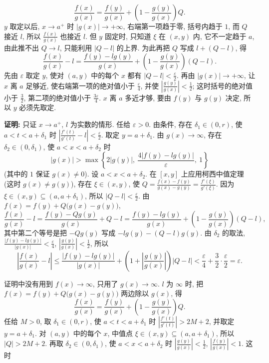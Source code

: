 \documentclass[UTF8,openany]{ctexbook}
\theoremstyle{chinesetextbook}
\newenvironment{cnproof}{\par\indent\textbf{证明:} \ignorespaces}{\par}
\begin{document}
\[
\frac{f(x)}{g(x)}=\frac{f(y)}{g(x)}+\left(1-\frac{g(y)}{g(x)}\right)Q.
\]
$y$ 取定以后, $x\to a^+$ 时 $|g(x)|\to+\infty$, 右端第一项趋于零, 括号内趋于 $1$, 而 $Q$ 接近 $l$, 所以 $\displaystyle\frac{f(x)}{g(x)}$ 也接近 $l$. 但 $y$ 固定时, 只知道 $\xi$ 在 $(x,y)$ 内, 它不一定趋于 $a$, 由此推不出 $Q\to l$, 只能利用 $|Q-l|$ 的上界. 为此再把 $Q$ 写成 $l+(Q-l)$, 得
\[
\frac{f(x)}{g(x)}-l=\frac{f(y)-lg(y)}{g(x)}+\left(1-\frac{g(y)}{g(x)}\right)(Q-l).
\]
先由 $\varepsilon$ 取定 $y$, 使对 $(a,y)$ 中的每个 $x$ 都有 $\displaystyle|Q-l|<\frac\varepsilon2$. 再由 $|g(x)|\to+\infty$, 让 $x$ 离 $a$ 足够近, 使右端第一项的绝对值小于 $\displaystyle\frac\varepsilon4$, 并使 $\displaystyle\left|\frac{g(y)}{g(x)}\right|<\frac12$; 这时括号的绝对值小于 $\displaystyle\frac32$, 第二项的绝对值小于 $\displaystyle\frac{3\varepsilon}4$. $x$ 离 $a$ 多近才够, 要由 $f(y)$ 与 $g(y)$ 决定, 所以 $y$ 必须先取定.
\begin{cnproof}
只证 $x\to a^+$, $l$ 为实数的情形. 任给 $\varepsilon>0$. 由条件, 存在 $\delta_1\in(0,r)$, 使 $a<t<a+\delta_1$ 时 $\displaystyle\left|\frac{f'(t)}{g'(t)}-l\right|<\frac\varepsilon2$. 取定 $y=a+\delta_1$. 由 $g(x)\to\infty$, 存在 $\delta_2\in(0,\delta_1)$, 使 $a<x<a+\delta_2$ 时
\[
|g(x)|>\max\left\{2|g(y)|,\ \frac{4|f(y)-lg(y)|}\varepsilon,\ 1\right\}
\]
(其中的 $1$ 保证 $g(x)\ne0$). 设 $a<x<a+\delta_2$. 在 $[x,y]$ 上应用柯西中值定理 (这时 $g(x)\ne g(y)$), 存在 $\xi\in(x,y)$, 使 $\displaystyle Q=\frac{f(x)-f(y)}{g(x)-g(y)}=\frac{f'(\xi)}{g'(\xi)}$. 因为 $\xi\in(x,y)\subseteq(a,a+\delta_1)$, 所以 $\displaystyle|Q-l|<\frac\varepsilon2$. 由 $f(x)=f(y)+Q\bigl(g(x)-g(y)\bigr)$,
\[
\frac{f(x)}{g(x)}-l=\frac{f(y)-Qg(y)}{g(x)}+Q-l=\frac{f(y)-lg(y)}{g(x)}+\left(1-\frac{g(y)}{g(x)}\right)(Q-l),
\]
其中第二个等号是把 $-Qg(y)$ 写成 $-lg(y)-(Q-l)g(y)$. 由 $\delta_2$ 的取法, $\displaystyle\frac{|f(y)-lg(y)|}{|g(x)|}<\frac\varepsilon4$, $\displaystyle\left|\frac{g(y)}{g(x)}\right|<\frac12$, 所以
\[
\left|\frac{f(x)}{g(x)}-l\right|\le\frac{|f(y)-lg(y)|}{|g(x)|}+\left(1+\left|\frac{g(y)}{g(x)}\right|\right)|Q-l|<\frac\varepsilon4+\frac32\cdot\frac\varepsilon2=\varepsilon.
\]
\end{cnproof}
证明中没有用到 $f(x)\to\infty$, 只用了 $g(x)\to\infty$. $l$ 为 $\infty$ 时, 把 $f(x)=f(y)+Q\bigl(g(x)-g(y)\bigr)$ 两边除以 $g(x)$, 得
\[
\frac{f(x)}{g(x)}=\frac{f(y)}{g(x)}+\left(1-\frac{g(y)}{g(x)}\right)Q.
\]
任给 $M>0$, 取 $\delta_1\in(0,r)$, 使 $a<t<a+\delta_1$ 时 $\displaystyle\left|\frac{f'(t)}{g'(t)}\right|>2M+2$, 并取定 $y=a+\delta_1$. 对 $(a,y)$ 中的每个 $x$, 中值点 $\xi\in(x,y)\subseteq(a,a+\delta_1)$, 所以 $|Q|>2M+2$. 再取 $\delta_2\in(0,\delta_1)$, 使 $a<x<a+\delta_2$ 时 $\displaystyle\left|\frac{g(y)}{g(x)}\right|<\frac12$, $\displaystyle\left|\frac{f(y)}{g(x)}\right|<1$. 这时
\end{document}
